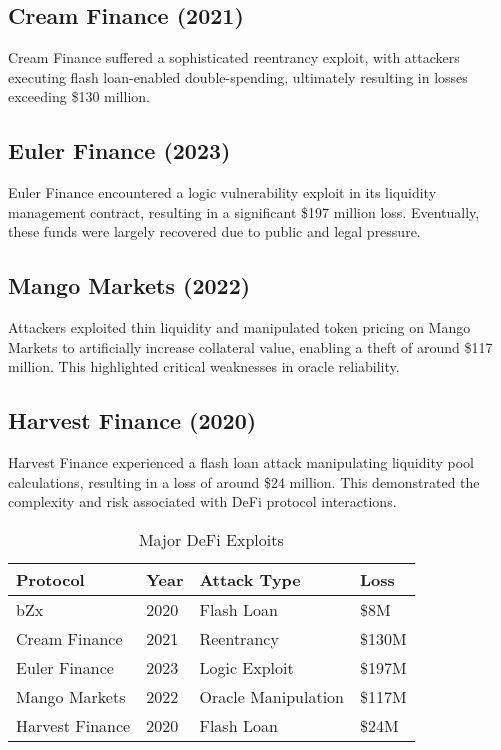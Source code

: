 \documentclass[conference]{IEEEtran}
\begin{document}
\subsection{Cream Finance (2021)}
Cream Finance suffered a sophisticated reentrancy exploit, with attackers executing flash loan-enabled double-spending, ultimately resulting in losses exceeding \$130 million.

\subsection{Euler Finance (2023)}
Euler Finance encountered a logic vulnerability exploit in its liquidity management contract, resulting in a significant \$197 million loss. Eventually, these funds were largely recovered due to public and legal pressure.

\subsection{Mango Markets (2022)}
Attackers exploited thin liquidity and manipulated token pricing on Mango Markets to artificially increase collateral value, enabling a theft of around \$117 million. This highlighted critical weaknesses in oracle reliability.

\subsection{Harvest Finance (2020)}
Harvest Finance experienced a flash loan attack manipulating liquidity pool calculations, resulting in a loss of around \$24 million. This demonstrated the complexity and risk associated with DeFi protocol interactions.

\begin{table}[htbp]
\caption{Major DeFi Exploits}
\centering
\begin{tabular}{@{}llll@{}}
\toprule
\textbf{Protocol} & \textbf{Year} & \textbf{Attack Type} & \textbf{Loss} \\
\midrule
bZx & 2020 & Flash Loan & \$8M \\
Cream Finance & 2021 & Reentrancy & \$130M \\
Euler Finance & 2023 & Logic Exploit & \$197M \\
Mango Markets & 2022 & Oracle Manipulation & \$117M \\
Harvest Finance & 2020 & Flash Loan & \$24M \\
\bottomrule
\end{tabular}
\end{table}
\end{document}
